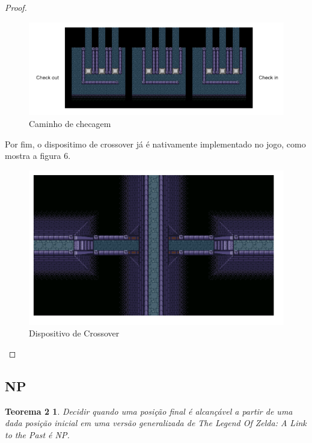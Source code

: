 \begin{proof}
    \begin{figure}[!htb]
        \centering
        \includegraphics[scale=0.7]{proof2.png}
        \caption{Caminho de checagem}
    \end{figure}
    
    Por fim, o dispositimo de crossover já é nativamente implementado no jogo, como mostra a figura 6.
    
    \begin{figure}[!htb]
         \centering
         \includegraphics[scale=0.7]{proof3.png}
         \caption{Dispositivo de Crossover}
    \end{figure}
    
\end{proof}

\subsection{NP}

\newtheorem*{theorem2}{Teorema 2}

\begin{theorem2}
    Decidir quando uma posição final é alcançável a partir de uma dada posição
    inicial em uma versão generalizada de The Legend Of Zelda: A Link to the Past é NP.
\end{theorem2}

